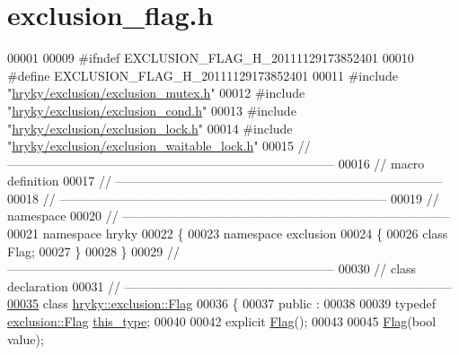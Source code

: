 \hypertarget{exclusion__flag_8h_source}{\section{exclusion\-\_\-flag.\-h}
}

\begin{DoxyCode}
00001 
00009 \textcolor{preprocessor}{#ifndef EXCLUSION\_FLAG\_H\_20111129173852401}
00010 \textcolor{preprocessor}{}\textcolor{preprocessor}{#define EXCLUSION\_FLAG\_H\_20111129173852401}
00011 \textcolor{preprocessor}{}\textcolor{preprocessor}{#include "\hyperlink{exclusion__mutex_8h}{hryky/exclusion/exclusion_mutex.h}"}
00012 \textcolor{preprocessor}{#include "\hyperlink{exclusion__cond_8h}{hryky/exclusion/exclusion_cond.h}"}
00013 \textcolor{preprocessor}{#include "\hyperlink{exclusion__lock_8h}{hryky/exclusion/exclusion_lock.h}"}
00014 \textcolor{preprocessor}{#include "\hyperlink{exclusion__waitable__lock_8h}{hryky/exclusion/exclusion_waitable_lock.h}"}
00015 \textcolor{comment}{//
      ------------------------------------------------------------------------------}
00016 \textcolor{comment}{// macro definition}
00017 \textcolor{comment}{//
      ------------------------------------------------------------------------------}
00018 \textcolor{comment}{//
      ------------------------------------------------------------------------------}
00019 \textcolor{comment}{// namespace}
00020 \textcolor{comment}{//
      ------------------------------------------------------------------------------}
00021 \textcolor{keyword}{namespace }hryky
00022 \{
00023 \textcolor{keyword}{namespace }exclusion
00024 \{
00026     \textcolor{keyword}{class }Flag;
00027 \}
00028 \}
00029 \textcolor{comment}{//
      ------------------------------------------------------------------------------}
00030 \textcolor{comment}{// class declaration}
00031 \textcolor{comment}{//
      ------------------------------------------------------------------------------}
\hypertarget{exclusion__flag_8h_source_l00035}{}\hyperlink{classhryky_1_1exclusion_1_1_flag}{00035} \textcolor{comment}{}\textcolor{keyword}{class }\hyperlink{classhryky_1_1exclusion_1_1_flag}{hryky::exclusion::Flag}
00036 \{
00037 \textcolor{keyword}{public} :
00038 
00039     \textcolor{keyword}{typedef} \hyperlink{classhryky_1_1exclusion_1_1_flag}{exclusion::Flag} \hyperlink{classhryky_1_1exclusion_1_1_flag}{this_type};
00040 
00042     \textcolor{keyword}{explicit} \hyperlink{classhryky_1_1exclusion_1_1_flag_a120d138be1d3f8d67ee976415f84de48}{Flag}();
00043 
00045     \hyperlink{classhryky_1_1exclusion_1_1_flag_a120d138be1d3f8d67ee976415f84de48}{Flag}(\textcolor{keywordtype}{bool} value);

\end{DoxyCode}
